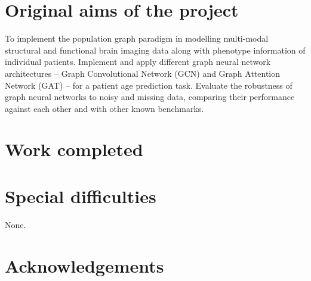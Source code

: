
\section*{Original aims of the project}

To implement the population graph paradigm in modelling multi-modal structural  and functional brain imaging data along with phenotype information of individual patients. Implement and apply different graph neural network architectures – Graph Convolutional Network (GCN) and Graph Attention Network (GAT) – for a patient age prediction task. Evaluate the robustness of graph neural networks to noisy and missing data, comparing their performance against each other and with other known benchmarks.

\section*{Work completed}

\section*{Special difficulties}

None.

\tableofcontents

\newpage
\section*{Acknowledgements}

